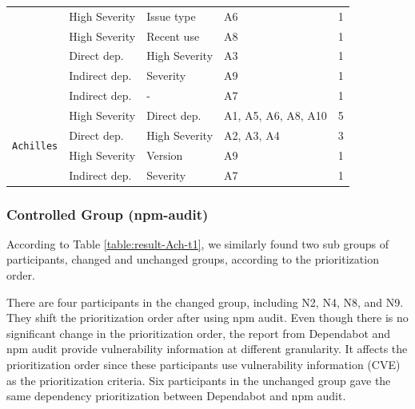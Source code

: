 \documentclass[conference]{IEEEtran}
\begin{document}
\begin{table}[tb]
{\begin{tabular}{cp{2cm}p{2cm}p{1.5cm}r}
				& High Severity & Issue type                      & A6                                            & 1               \\ 
				& High Severity & Recent use                      & A8                                            & 1               \\ 
				& Direct dep.  & High Severity                   & A3                                            & 1               \\ 
				& Indirect dep. & Severity                        & A9                                            & 1               \\ 
				& Indirect dep. & - & A7                                            & 1               \\ 
				\midrule
				\multirow{5}{*}{\texttt{Achilles}}  & High Severity & Direct dep.                          & A1, A5, A6, A8, A10                           & 5               \\ 
				& Direct dep.  & High Severity                   & A2, A3, A4 & 3               \\ 
				& High Severity & Version                         & A9                                            & 1               \\ 
				& Indirect dep. & Severity                        & A7                                            & 1               \\ 
				\bottomrule
			\end{tabular}
		}
		\label{table:prioritization_factor}
	\end{table}
	
	\subsubsection{Controlled Group (npm-audit)}
	According to Table \ref{table:result-Ach-t1}, we similarly found two sub groups of participants, changed and unchanged groups, according to the prioritization order.
	
	There are four participants in the changed group, including N2, N4, N8, and N9. They shift the prioritization order after using npm audit. Even though there is no significant change in the prioritization order, the report from Dependabot and npm audit provide vulnerability information at different granularity. It affects the prioritization order since these participants use vulnerability information (CVE) as the prioritization criteria. Six participants in the unchanged group gave the same dependency prioritization between Dependabot and npm audit.
	
\end{document}
